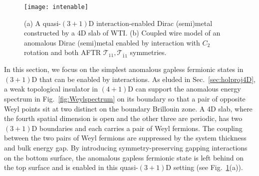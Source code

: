 \begin{figure}[htbp]
	\centering\texttt{[image: intenable]}
	\caption[(a) A quasi-$(3+1)$D interaction-enabled Dirac (semi)metal constructed by a 4D slab of WTI. (b) Coupled wire model of an anomalous Dirac (semi)metal.]{(a) A quasi-$(3+1)$D interaction-enabled Dirac (semi)metal constructed by a 4D slab of WTI. (b) Coupled wire model of an anomalous Dirac (semi)metal enabled by interaction with $C_2$ rotation and both AFTR $\mathcal{T}_{11},\mathcal{T}_{\bar{1}1}$ symmetries.}\label{fig:intenable}
\end{figure}

In this section, we focus on the simplest anomalous gapless fermionic states in $(3+1)$D that can be enabled by interactions. As eluded in Sec.~\ref{sec:holproj4D}, a weak topological insulator in $(4+1)$D can support the anomalous energy spectrum in Fig.~\ref{fig:Weylspectrum} on its boundary so that a pair of opposite Weyl points sit at two distinct \TRIM on the boundary Brillouin zone. A 4D \WTI slab, where the fourth spatial dimension is open and the other three are periodic, has two $(3+1)$D boundaries and each carries a pair of Weyl fermions. The coupling between the two pairs of Weyl fermions are suppressed by the system thickness and bulk energy gap. By introducing symmetry-preserving gapping interactions on the bottom surface, the anomalous gapless fermionic state is left behind on the top surface and is enabled in this quasi-$(3+1)$D setting (see Fig.~\ref{fig:intenable}(a)).

